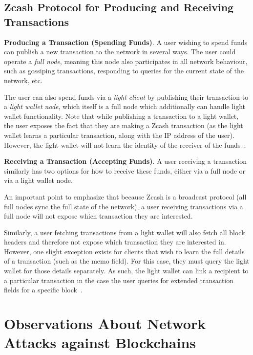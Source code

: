 \documentclass{article}
\begin{document}
\subsection{Zcash Protocol for Producing and Receiving Transactions}

\textbf{Producing a Transaction (Spending Funds)}.
A user wishing to spend
funds can publish a new transaction to the network in several ways. The user
could operate a \emph{full node}, meaning this node also participates in all
network behaviour, such as gossiping transactions, responding to queries for
the current state of the network, etc.

The user can also spend funds via a \emph{light
client} by publishing their transaction to a
\emph{light wallet node}, which itself is a full node which additionally can handle
light wallet functionality. Note that while publishing a transaction to a light
wallet, the user exposes the fact that they are making a Zcash transaction (as
the light wallet learns a particular transaction, along with the IP address of
the user). However, the light wallet will not learn the identity of the
receiver of the funds~\cite{light-wallet-spec}.

\textbf{Receiving a Transaction (Accepting Funds)}. A user receiving a
transaction similarly has two options for how to receive these funds, either
via a full node or via a light wallet node.

An important point to emphasize that because Zcash is a broadcast protocol (all
full nodes sync the full state of the network), a user receiving transactions
via a full node will not expose which transaction they are interested.

Similarly, a user fetching transactions from a light wallet will also fetch all
block headers and therefore not expose which transaction they are interested
in. However, one slight exception exists for clients that wish
to learn the full details of a transaction (such as the memo field). For this
case,
they must query the light wallet for those details separately. As such, the
light wallet can link a recipient to a particular transaction in the case the
user queries for extended transaction fields for a specific block~\cite{light-wallet-spec}.

\section{Observations About Network Attacks against Blockchains}
\label{observations}
\end{document}
